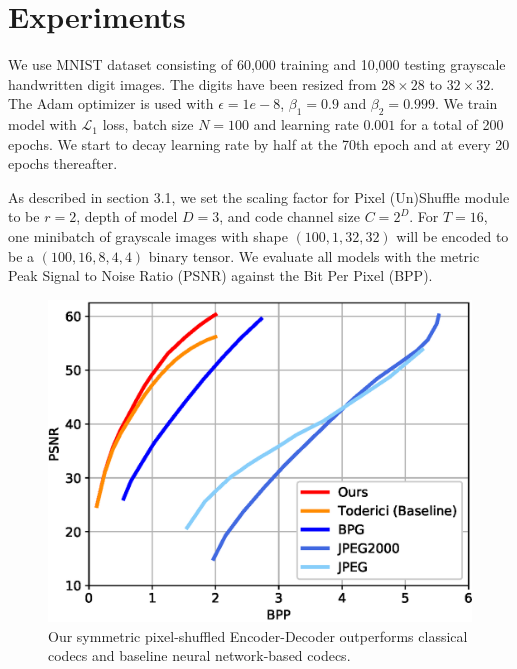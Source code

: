\documentclass[10pt,twocolumn,letterpaper]{article}
\begin{document}
\section{Experiments}
We use MNIST dataset \cite{lecun1998gradient} consisting of 60,000 training and 10,000 testing grayscale handwritten digit images. The digits have been resized from $28 \times 28$ to $32 \times 32$. The Adam optimizer \cite{kingma2014adam} is used with $\epsilon = 1e-8$, $\beta_1 = 0.9$ and $\beta_2 = 0.999$. We train model with $\mathcal{L}_1$ loss, batch size $N=100$ and learning rate $0.001$ for a total of 200 epochs. We start to decay learning rate by half at the 70th epoch and at every 20 epochs thereafter.

As described in section 3.1, we set the scaling factor for Pixel (Un)Shuffle module to be $r=2$, depth of model $D=3$, and code channel size $C=2^D$. For $T=16$, one minibatch of grayscale images with shape $(100,1,32,32)$ will be encoded to be a $(100,16,8,4,4)$ binary tensor. We evaluate all models with the metric Peak Signal to Noise Ratio (PSNR) against the Bit Per Pixel (BPP).

\begin{figure}[t]
\begin{center}
\includegraphics[width=0.8\linewidth]{figure/codec.eps}
\end{center}
	\vspace{-0.2cm}
   \caption{Our symmetric pixel-shuffled Encoder-Decoder outperforms classical codecs and baseline neural network-based codecs.}
   \vspace{-0.2cm}
\label{fig_3}
\end{figure}
\end{document}

